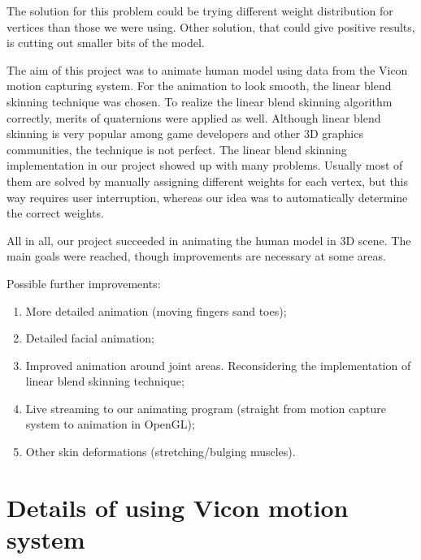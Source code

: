 \documentclass[times, 10pt,twocolumn]{article}
\begin{document}
The solution for this problem could be trying different weight distribution for vertices than those we were using.
Other solution, that could give positive results, is cutting out smaller bits of the model.


 The aim of this project was to animate human model using data from the Vicon motion capturing system. For the animation to look smooth, the linear blend skinning technique was chosen. To realize the linear blend skinning algorithm correctly, merits of quaternions were applied as well. Although linear blend skinning is very popular among game developers and other 3D graphics communities, the technique is not perfect. The linear blend skinning implementation in our project showed up with many problems. Usually most of them are solved by manually assigning different weights for each vertex, but this way requires user interruption, whereas our idea was to automatically determine the correct weights.

 All in all, our project succeeded in animating the human model in 3D scene. The main goals were reached, though improvements are necessary at some areas.

Possible further improvements:
\begin{enumerate}
    \item More detailed animation (moving fingers sand toes);
    \item Detailed facial animation;
    \item Improved animation around joint areas. Reconsidering the implementation of linear blend skinning technique;
    \item Live streaming to our animating program (straight from motion capture system to animation in OpenGL);
    \item Other skin deformations (stretching/bulging muscles).
\end{enumerate}

\clearpage
\newpage

\appendix

\section{Details of using Vicon motion system}
\label{Vicon appendix}


\clearpage
\newpage

\nocite{ex1,ex2,ex3,ex4,ex5,ex6,ex7,ex8,ex9,ex10,ex11,ex12,ex13,ex14,ex15}


\end{document}
